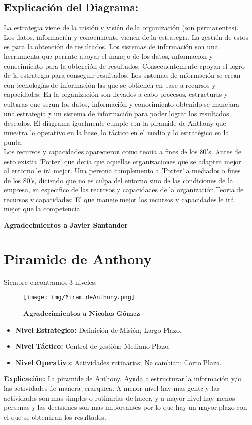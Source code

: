 \documentclass{templateNote}
\begin{document}
\newpage
\subsection*{Explicación del Diagrama:}
\indent
La estrategia viene de la misión y visión de la organización (son permanentes). Los datos, información y conocimiento vienen de la estrategia. La gestión de estos es para la obtención de resultados. Los sistemas de información son una herramienta que perimte apoyar el manejo de los datos, información y conocimiento para la obtención de resultados.
Consecuentemente apoyan el logro de la estrategia para conseguir resultados. Los sistemas de información se crean con tecnologías de información las que se obtienen en base a recursos y capacidades. En la organización son llevados a cabo procesos, estructuras y culturas que segun los datos, información y conocimiento obtenido se manejara una estrategia y un sistema de información para poder lograr los resultados deseados. El diagrama igualmente cumple con la piramide de Anthony que muestra lo operativo en la base, lo táctico en el medio y lo estratégico en la punta.
\\
Los recursos y capacidades aparecieron como teoria a fines de los 80's. Antes de esto existia 'Porter' que decia que aquellas organizaciones que se adapten mejor al entorno le irá mejor. Una persona complemento a 'Porter' a mediados o fines de los 80's, diciendo que no es culpa del entorno sino de las condiciones de la empresa, en especifico de los recursos y capacidades de la organización.Teoria de recursos y capacidades: El que maneje mejor los recursos y capacidades le irá mejor que la competencia.
\\
\begin{center}
    \textbf{Agradecimientos a Javier Santander}
\end{center}
\newpage
\section{Piramide de Anthony}
\indent
Siempre encontramos 3 niveles:
\begin{figure}[H]
    \centering
    \texttt{[image: img/PiramideAnthony.png]}
    
    \textbf{Agradecimientos a Nicolas Gómez}
\end{figure}
\begin{itemize}
    \item \textbf{Nivel Estrategico:} Definición de Misión; Largo Plazo.
    \item \textbf{Nivel Táctico:} Control de gestión; Mediano Plazo.
    \item \textbf{Nivel Operativo:} Actividades rutinarias; No cambian; Corto Plazo.
\end{itemize}
\textbf{Explicación:} La piramide de Anthony. Ayuda a estructurar la información y/o las actividades de manera jerarquica. A menor nivel hay mas gente y las actividades son mas simples o rutinarias de hacer, y a mayor nivel hay menos personas y las decisiones son mas importantes por lo que hay un mayor plazo con el que se obtendran los resultados.
\end{document}
